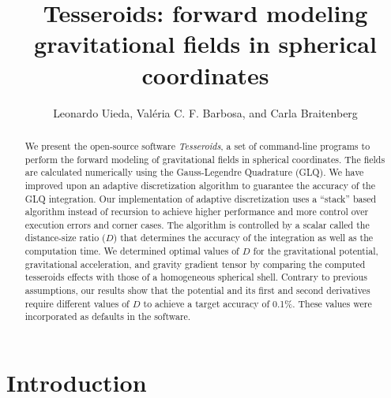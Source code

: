 \documentclass[paper,twocolumn,twoside]{geophysics}
\title{
    Tesseroids: forward modeling gravitational fields in spherical coordinates
}
\author{
    Leonardo Uieda\footnotemark[1]\footnotemark[2],
    Val\'eria C. F. Barbosa\footnotemark[2],
    and
    Carla Braitenberg\footnotemark[3]
}
\begin{document}
\maketitle


\address{
\footnotemark[1]Universidade do Estado do Rio de Janeiro,
Rio de Janeiro, Brazil.
email: leouieda@gmail.com
\\
\footnotemark[2]Observat\'orio Nacional,
Rio de Janeiro, Brazil.
\\
\footnotemark[3]Department of Mathematics and Geosciences, University of
Trieste, Trieste, Italy
}

\begin{abstract}
We present the open-source software \emph{Tesseroids},
a set of command-line programs to perform the forward modeling
of gravitational fields in spherical coordinates.
The fields are calculated numerically using
the Gauss-Legendre Quadrature (GLQ).
We have improved upon an adaptive discretization algorithm
to guarantee the accuracy of the GLQ integration.
Our implementation of adaptive discretization
uses a  ``stack'' based algorithm
instead of recursion to achieve higher performance
and more control over execution errors and corner cases.
The algorithm is controlled by
a scalar called the distance-size ratio ($D$)
that determines the accuracy of the integration as well as
the computation time.
We determined optimal values of $D$
for the gravitational potential, gravitational acceleration,
and gravity gradient tensor
by comparing the computed tesseroids effects
with those of a homogeneous spherical shell.
Contrary to previous assumptions,
our results show that the potential and its first and second derivatives
require different values of $D$ to achieve a target accuracy of 0.1\%.
These values were incorporated as defaults in the software.
\end{abstract}



\section{Introduction}


\end{document}
